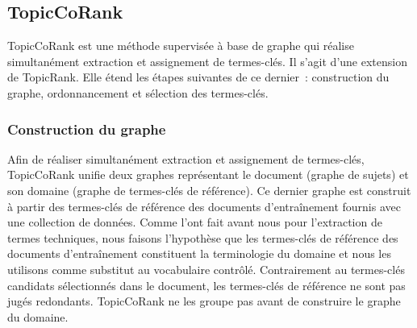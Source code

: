     \subsection{TopicCoRank}
    \label{subsec:main-automatic_keyphrase_annotation-supervised_automatic_keyphrase_annotation-topiccorank}
      TopicCoRank est une méthode supervisée à base de graphe qui réalise
      simultanément extraction et assignement de termes-clés. Il s'agit d'une
      extension de TopicRank. Elle étend les étapes suivantes de ce dernier~:
      construction du graphe, ordonnancement et sélection des termes-clés.

      \subsubsection{Construction du graphe}
      \label{subsubsec:main-automatic_keyphrase_annotation-supervised_automatic_keyphrase_extraction-topiccorank-graph_construction}
        Afin de réaliser simultanément extraction et assignement de termes-clés,
        TopicCoRank unifie deux graphes représentant le document (graphe de
        sujets) et son domaine (graphe de termes-clés de référence). Ce dernier
        graphe est construit à partir des termes-clés de référence des documents
        d'entraînement fournis avec une collection de données. Comme
         l'ont fait avant nous
        pour l'extraction de termes techniques, nous faisons l'hypothèse que les
        termes-clés de référence des documents d'entraînement constituent la
        terminologie du domaine et nous les utilisons comme substitut au
        vocabulaire contrôlé. Contrairement au termes-clés candidats
        sélectionnés dans le document, les termes-clés de référence ne sont pas
        jugés redondants. TopicCoRank ne les groupe pas avant de construire le
        graphe du domaine.

